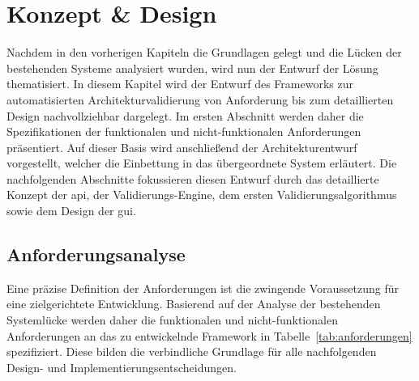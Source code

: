 
\chapter{Konzept \& Design}
\label{ch:KuD}

Nachdem in den vorherigen Kapiteln die Grundlagen gelegt und die Lücken der bestehenden Systeme analysiert wurden, wird nun der Entwurf der Lösung thematisiert. In diesem Kapitel wird der Entwurf des Frameworks zur automatisierten Architekturvalidierung von Anforderung bis zum detaillierten Design nachvollziehbar dargelegt. Im ersten Abschnitt werden daher die Spezifikationen der funktionalen und nicht-funktionalen Anforderungen präsentiert. Auf dieser Basis wird anschließend der Architekturentwurf vorgestellt, welcher die Einbettung in das übergeordnete System erläutert. Die nachfolgenden Abschnitte fokussieren diesen Entwurf durch das detaillierte Konzept der \gls{api}, der Validierungs-Engine, dem ersten Validierungsalgorithmus sowie dem Design der \gls{gui}.


\section{Anforderungsanalyse}
\label{sec:Anforderungsanalyse}

Eine präzise Definition der Anforderungen ist die zwingende Voraussetzung für eine zielgerichtete Entwicklung. Basierend auf der Analyse der bestehenden Systemlücke werden daher die funktionalen und nicht-funktionalen Anforderungen an das zu entwickelnde Framework in Tabelle~\ref{tab:anforderungen} spezifiziert. Diese bilden die verbindliche Grundlage für alle nachfolgenden Design- und Implementierungsentscheidungen.


